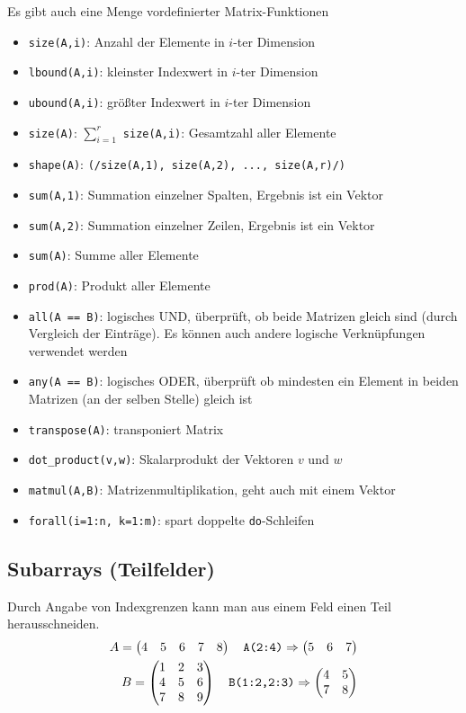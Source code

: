 Es gibt auch eine Menge vordefinierter Matrix-Funktionen
\begin{itemize}
	\item\texttt{size(A,i)}: Anzahl der Elemente in $i$-ter Dimension
	\item\texttt{lbound(A,i)}: kleinster Indexwert in $i$-ter Dimension
	\item\texttt{ubound(A,i)}: größter Indexwert in $i$-ter Dimension
	\item\texttt{size(A)}: $\sum_{i=1}^{r}$ \texttt{size(A,i)}: Gesamtzahl aller Elemente
	\item\texttt{shape(A)}: \texttt{(/size(A,1), size(A,2), ..., size(A,r)/)}
	\item\texttt{sum(A,1)}: Summation einzelner Spalten, Ergebnis ist ein Vektor
	\item\texttt{sum(A,2)}: Summation einzelner Zeilen, Ergebnis ist ein Vektor
	\item\texttt{sum(A)}: Summe aller Elemente
	\item\texttt{prod(A)}: Produkt aller Elemente
	\item\texttt{all(A == B)}: logisches UND, überprüft, ob beide Matrizen gleich sind (durch Vergleich der Einträge). Es können auch andere logische Verknüpfungen verwendet werden
	\item\texttt{any(A == B)}: logisches ODER, überprüft ob mindesten ein Element in beiden Matrizen (an der selben Stelle) gleich ist
	\item\texttt{transpose(A)}: transponiert Matrix
	\item\texttt{dot\_product(v,w)}: Skalarprodukt der Vektoren $v$ und $w$
	\item\texttt{matmul(A,B)}: Matrizenmultiplikation, geht auch mit einem Vektor
	\item\texttt{forall(i=1:n, k=1:m)}: spart doppelte \texttt{do}-Schleifen
\end{itemize}

\subsection{Subarrays (Teilfelder)}

Durch Angabe von Indexgrenzen kann man aus einem Feld einen Teil herausschneiden.
\begin{align}
	A = \begin{pmatrix}4&5&6&7&8\end{pmatrix} \quad\texttt{A(2:4)}\Rightarrow \begin{pmatrix}5&6&7\end{pmatrix} \notag \\
	B = \begin{pmatrix}1&2&3\\4&5&6\\7&8&9\end{pmatrix} \quad\texttt{B(1:2,2:3)}\Rightarrow \begin{pmatrix}4&5\\7&8\end{pmatrix} \notag
\end{align}

